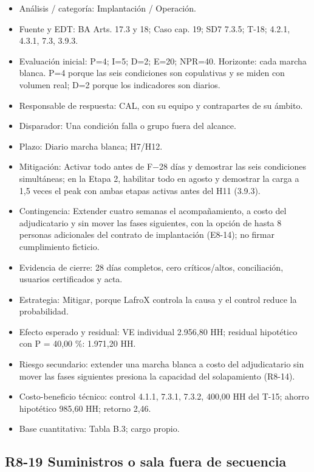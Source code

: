 \begin{itemize}[leftmargin=*,itemsep=3pt]
\item Análisis / categoría: Implantación / Operación.
\item Fuente y EDT: BA Arts. 17.3 y 18; Caso cap. 19; SD7 7.3.5; T-18; 4.2.1, 4.3.1, 7.3, 3.9.3.
\item Evaluación inicial: P=4; I=5; D=2; E=20; NPR=40. Horizonte: cada marcha blanca. P=4 porque las seis condiciones son copulativas y se miden con volumen real; D=2 porque los indicadores son diarios.
\item Responsable de respuesta: CAL, con su equipo y contrapartes de su ámbito.
\item Disparador: Una condición falla o grupo fuera del alcance.
\item Plazo: Diario marcha blanca; H7/H12.
\item Mitigación: Activar todo antes de F\ensuremath{-}28 días y demostrar las seis condiciones simultáneas; en la Etapa 2, habilitar todo en agosto y demostrar la carga a 1,5 veces el peak con ambas etapas activas antes del H11 (3.9.3).
\item Contingencia: Extender cuatro semanas el acompañamiento, a costo del adjudicatario y sin mover las fases siguientes, con la opción de hasta 8 personas adicionales del contrato de implantación (E8-14); no firmar cumplimiento ficticio.
\item Evidencia de cierre: 28 días completos, cero críticos/altos, conciliación, usuarios certificados y acta.
\item Estrategia: Mitigar, porque LafroX controla la causa y el control reduce la probabilidad.
\item Efecto esperado y residual: VE individual 2.956,80 HH; residual hipotético con P = 40,00 \%: 1.971,20 HH.
\item Riesgo secundario: extender una marcha blanca a costo del adjudicatario sin mover las fases siguientes presiona la capacidad del solapamiento (R8-14).
\item Costo-beneficio técnico: control 4.1.1, 7.3.1, 7.3.2, 400,00 HH del T-15; ahorro hipotético 985,60 HH; retorno 2,46.
\item Base cuantitativa: Tabla B.3; cargo propio.
\end{itemize}

\subsection*{R8-19 \textemdash{} Suministros o sala fuera de secuencia}

